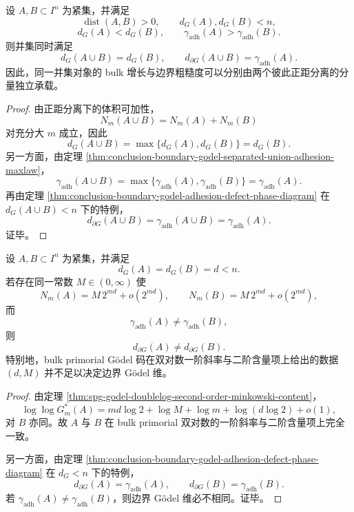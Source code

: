 \begin{theorem}\label{thm:conclusion-boundary-godel-bulk-edge-dominant-component-separation}
设 \(A,B\subset I^n\) 为紧集，并满足
\[
\operatorname{dist}(A,B)>0,\qquad d_G(A),d_G(B)<n,
\]
\[
d_G(A)<d_G(B),\qquad
\gamma_{\mathrm{adh}}(A)>\gamma_{\mathrm{adh}}(B).
\]
则并集同时满足
\[
d_G(A\cup B)=d_G(B),
\qquad
d_{\partial G}(A\cup B)=\gamma_{\mathrm{adh}}(A).
\]
因此，同一并集对象的 bulk 增长与边界粗糙度可以分别由两个彼此正距分离的分量独立承载。
\end{theorem}
\begin{proof}
由正距分离下的体积可加性，
\[
N_m(A\cup B)=N_m(A)+N_m(B)
\]
对充分大 \(m\) 成立，因此
\[
d_G(A\cup B)=\max\{d_G(A),d_G(B)\}=d_G(B).
\]
另一方面，由定理 \ref{thm:conclusion-boundary-godel-separated-union-adhesion-maxlaw}，
\[
\gamma_{\mathrm{adh}}(A\cup B)
=
\max\{\gamma_{\mathrm{adh}}(A),\gamma_{\mathrm{adh}}(B)\}
=\gamma_{\mathrm{adh}}(A).
\]
再由定理 \ref{thm:conclusion-boundary-godel-adhesion-defect-phase-diagram} 在 \(d_G(A\cup B)<n\) 下的特例，
\[
d_{\partial G}(A\cup B)=\gamma_{\mathrm{adh}}(A\cup B)=\gamma_{\mathrm{adh}}(A).
\]
证毕。
\end{proof}

\begin{theorem}\label{thm:conclusion-boundary-godel-bulk-secondorder-jet-incomplete}
设 \(A,B\subset I^n\) 为紧集，并满足
\[
d_G(A)=d_G(B)=d<n.
\]
若存在同一常数 \(M\in(0,\infty)\) 使
\[
N_m(A)=M\,2^{md}+o(2^{md}),
\qquad
N_m(B)=M\,2^{md}+o(2^{md}),
\]
而
\[
\gamma_{\mathrm{adh}}(A)\neq \gamma_{\mathrm{adh}}(B),
\]
则
\[
d_{\partial G}(A)\neq d_{\partial G}(B).
\]
特别地，bulk primorial Gödel 码在双对数一阶斜率与二阶含量项上给出的数据 \((d,M)\) 并不足以决定边界 Gödel 维。
\end{theorem}
\begin{proof}
由定理 \ref{thm:spg-godel-doublelog-second-order-minkowski-content}，
\[
\log\log G_m^\ast(A)
=md\log 2+\log M+\log m+\log(d\log 2)+o(1),
\]
对 \(B\) 亦同。故 \(A\) 与 \(B\) 在 bulk primorial 双对数的一阶斜率与二阶含量项上完全一致。

另一方面，由定理 \ref{thm:conclusion-boundary-godel-adhesion-defect-phase-diagram} 在 \(d_G<n\) 下的特例，
\[
d_{\partial G}(A)=\gamma_{\mathrm{adh}}(A),
\qquad
d_{\partial G}(B)=\gamma_{\mathrm{adh}}(B).
\]
若 \(\gamma_{\mathrm{adh}}(A)\neq \gamma_{\mathrm{adh}}(B)\)，则边界 Gödel 维必不相同。证毕。
\end{proof}

